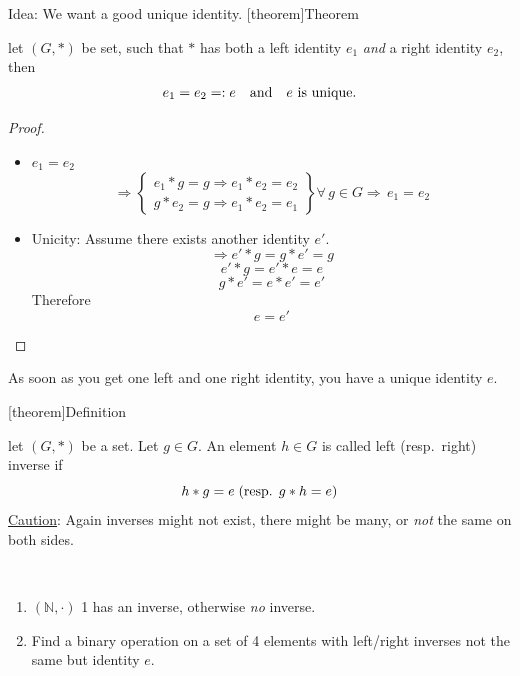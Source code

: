 \documentclass[12pt]{report}
\theoremstyle{definition}
\begin{document}
Idea: We want a good unique identity.
[theorem]{Theorem}
\begin{unique identity}
    let $(G, *)$ be set, such that $*$ has both a left identity $e_1$ \emph{and}
    a right identity $e_2$, then\[
        e_1 = e_2 =: e \quad \textnormal{and} \quad e \textnormal{ is unique.}
    \]
\end{unique identity}

\begin{proof}
    \;

    \begin{itemize}
            \item $e_1 = e_2$
    \[
    \Rightarrow \left\{
        \begin{array}{l}
        e_1 * g = g \Rightarrow e_1 * e_2 = e_2 \\
        g * e_2 = g \Rightarrow e_1 * e_2 = e_1
    \end{array}
\right\} \forall\,g \in G \Rightarrow\,e_1 = e_2%
\]
            \item Unicity: Assume there exists another identity $e'$.\[
                \Rightarrow e' * g = g * e' = g
            \]\[
                e' * g = e' * e = e
            \]\[
                g * e' = e * e' = e'
            \]Therefore \[
                e = e'
            \]
    \end{itemize}
    
\end{proof}
As soon as you get one left and one right identity, you have a unique identity $e$.

[theorem]{Definition}
\begin{inverse}
    let $(G,*)$ be a set. Let $g \in G$.
    An element $h \in G$ is called left (resp.\ right) inverse if\[
        h * g = e \;(\textnormal{resp. } g * h = e)
    \]
    \underline{Caution}: Again inverses might not exist, 
    there might be many, or \emph{not} the same on both sides.
\end{inverse}

\begin{ex}
    \,

    \begin{enumerate}[label = (\arabic*)]
        \item $(\mathbb{N}, \cdot)$
            1 has an inverse, otherwise \emph{no} inverse.
        \item Find a binary operation on a set of 4 elements with left/right inverses
            not the same but identity $e$.
    \end{enumerate}
    
\end{ex}
\end{document}
